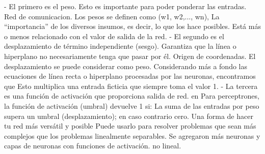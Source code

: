 - El primero es el peso. Esto es importante para poder ponderar las entradas. 
 Red de comunicacion. Los pesos se definen como (w1, w2,..., wn), 
La “importancia” de los diversos insumos, es decir, lo que los hace posibles. 
Está más o menos relacionado con el valor de salida de la red. 
- El segundo es el desplazamiento de término independiente (sesgo). 
Garantiza que la línea o hiperplano no necesariamente tenga que pasar  por él. 
Origen de coordenadas. El desplazamiento se puede considerar como peso. 
Considerando más a fondo las ecuaciones de línea recta o hiperplano procesadas por las neuronas, encontramos que  
Esto multiplica  una entrada ficticia que siempre toma el valor 1. 
- La tercera es una función de activación que proporciona  salida de red. en 
 Para perceptrones, la función de activación (umbral) devuelve 1 si: 
La suma de las entradas por peso supera un umbral (desplazamiento); 
 en caso contrario cero. Una forma de hacer tu red más versátil y posible 
Puede usarlo para  resolver problemas que sean más complejos que los problemas linealmente separables. 
Se agregaron más neuronas y  capas de neuronas con funciones de activación. 
no lineal. 

